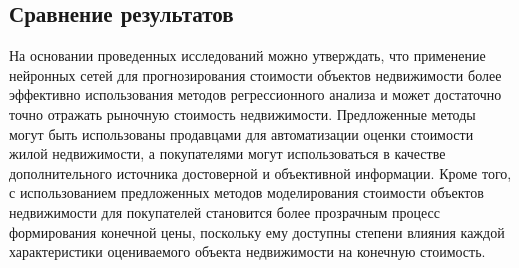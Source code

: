 \subsection{Сравнение результатов}
\label{sec:experiment:conclusion}

На основании проведенных исследований можно утверждать, что применение нейронных сетей для прогнозирования
стоимости объектов недвижимости более эффективно использования методов регрессионного анализа и может достаточно
точно отражать рыночную стоимость недвижимости. Предложенные методы могут быть
использованы продавцами для автоматизации оценки стоимости жилой недвижимости, а покупателями могут использоваться в 
качестве дополнительного источника достоверной и объективной информации. Кроме того, с использованием предложенных
методов моделирования стоимости объектов недвижимости для покупателей становится более
прозрачным процесс формирования конечной цены, поскольку ему доступны степени влияния каждой характеристики оцениваемого
объекта недвижимости на конечную стоимость.
